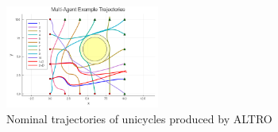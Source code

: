 \begin{figure}[t]\label{fig:MA}
	\centering
	\includegraphics[width=0.45\textwidth]{figures/MA.png}
	\caption{Nominal trajectories of unicycles produced by ALTRO}
\end{figure}


